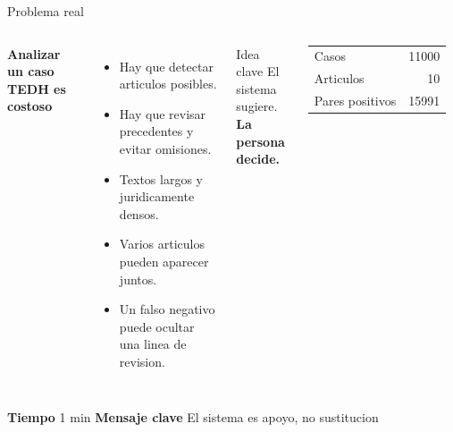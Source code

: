 \documentclass[aspectratio=169,10pt]{beamer}
\newcommand{\slidemeta}[2]{
  \vfill
  {\scriptsize\color{Muted}\textbf{Tiempo} #1 \hfill \textbf{Mensaje clave} #2}
}
\begin{document}
\begin{frame}{Problema real}
  \begin{columns}[T,onlytextwidth]
    \textbf{Analizar un caso TEDH es costoso}
    \begin{itemize}
      \item Hay que detectar articulos posibles.
      \item Hay que revisar precedentes y evitar omisiones.
      \item Textos largos y juridicamente densos.
      \item Varios articulos pueden aparecer juntos.
      \item Un falso negativo puede ocultar una linea de revision.
    \end{itemize}
    \begin{block}{Idea clave}
      El sistema sugiere.\\
      \textbf{La persona decide.}
    \end{block}
    \vspace{0.15cm}
    \begin{tabular}{lr}
      \toprule
      Casos & 11000\\
      Articulos & 10\\
      Pares positivos & 15991\\
      \bottomrule
    \end{tabular}
  \end{columns}
  \slidemeta{1 min}{El sistema es apoyo, no sustitucion}
\end{frame}
\end{document}
